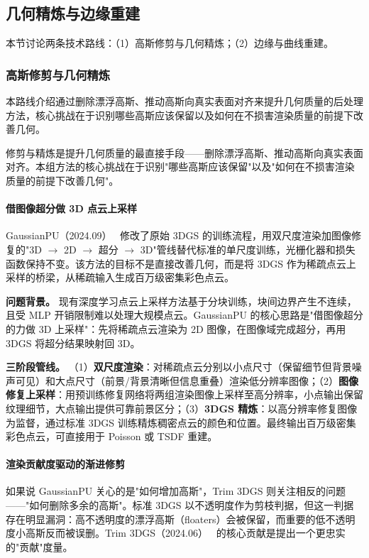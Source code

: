 \subsection{几何精炼与边缘重建}
\label{ss:04_6a}

本节讨论两条技术路线：（1）高斯修剪与几何精炼；（2）边缘与曲线重建。

\subsubsection{高斯修剪与几何精炼}

本路线介绍通过删除漂浮高斯、推动高斯向真实表面对齐来提升几何质量的后处理方法，核心挑战在于识别哪些高斯应该保留以及如何在不损害渲染质量的前提下改善几何。

修剪与精炼是提升几何质量的最直接手段——删除漂浮高斯、推动高斯向真实表面对齐。本组方法的核心挑战在于识别"哪些高斯应该保留"以及"如何在不损害渲染质量的前提下改善几何"。

\paragraph{借图像超分做 3D 点云上采样}

GaussianPU（2024.09）~\cite{2409_01581} 修改了原始 3DGS 的训练流程，用双尺度渲染加图像修复的"3D $\to$ 2D $\to$ 超分 $\to$ 3D"管线替代标准的单尺度训练，光栅化器和损失函数保持不变。该方法的目标不是直接改善几何，而是将 3DGS 作为稀疏点云上采样的桥梁，从稀疏输入生成百万级密集彩色点云。

\textbf{问题背景。} 现有深度学习点云上采样方法基于分块训练，块间边界产生不连续，且受 MLP 开销限制难以处理大规模点云。GaussianPU 的核心思路是"借图像超分的力做 3D 上采样"：先将稀疏点云渲染为 2D 图像，在图像域完成超分，再用 3DGS 将超分结果映射回 3D。

\textbf{三阶段管线。} （1）\textbf{双尺度渲染}：对稀疏点云分别以小点尺寸（保留细节但背景噪声可见）和大点尺寸（前景/背景清晰但信息重叠）渲染低分辨率图像；（2）\textbf{图像修复上采样}：用预训练修复网络将两组渲染图像上采样至高分辨率，小点输出保留纹理细节，大点输出提供可靠前景区分；（3）\textbf{3DGS 精炼}：以高分辨率修复图像为监督，通过标准 3DGS 训练精炼稠密点云的颜色和位置。最终输出百万级密集彩色点云，可直接用于 Poisson 或 TSDF 重建。

\paragraph{渲染贡献度驱动的渐进修剪}

如果说 GaussianPU 关心的是"如何增加高斯"，Trim 3DGS 则关注相反的问题——"如何删除多余的高斯"。标准 3DGS 以不透明度作为剪枝判据，但这一判据存在明显漏洞：高不透明度的漂浮高斯（floaters）会被保留，而重要的低不透明度小高斯反而被误删。Trim 3DGS（2024.06）~\cite{2406_07499} 的核心贡献是提出一个更忠实的"贡献"度量。

